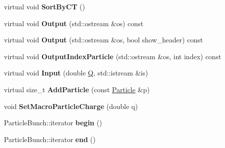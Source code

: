 \begin{DoxyCompactItemize}
virtual void {\bfseries Sort\+By\+CT} ()
\item 
\mbox{\label{classParticleTracking_1_1ParticleBunch_ab2c718545d78bc05e29d6f732859bb8c}} 
virtual void {\bfseries Output} (std\+::ostream \&os) const
\item 
\mbox{\label{classParticleTracking_1_1ParticleBunch_a072f88429da926afd6c60b6ec00fe767}} 
virtual void {\bfseries Output} (std\+::ostream \&os, bool show\+\_\+header) const
\item 
\mbox{\label{classParticleTracking_1_1ParticleBunch_aba428b139a379cb0413ebe63f046f1f5}} 
virtual void {\bfseries Output\+Index\+Particle} (std\+::ostream \&os, int index) const
\item 
\mbox{\label{classParticleTracking_1_1ParticleBunch_ab6d406ac47400a839e8f689c96133ddc}} 
virtual void {\bfseries Input} (double \hyperlink{namespaceParticleTracking_a3e89510a540596b235a808915deb0f7a}{Q}, std\+::istream \&is)
\item 
\mbox{\label{classParticleTracking_1_1ParticleBunch_a9702a34dc6146c73507e8050dec09e4f}} 
virtual size\+\_\+t {\bfseries Add\+Particle} (const \hyperlink{classPSvector}{Particle} \&p)
\item 
\mbox{\label{classParticleTracking_1_1ParticleBunch_a3d0b76d7d4de8a034551cb0b396881f0}} 
void {\bfseries Set\+Macro\+Particle\+Charge} (double q)
\item 
\mbox{\label{classParticleTracking_1_1ParticleBunch_a0a60374c23c8b8c9d99e7d1c6cb90847}} 
Particle\+Bunch\+::iterator {\bfseries begin} ()
\item 
\mbox{\label{classParticleTracking_1_1ParticleBunch_a02fa2b3c2101801795673309a13134fc}} 
Particle\+Bunch\+::iterator {\bfseries end} ()
\item 
\mbox{\label{classParticleTracking_1_1ParticleBunch_aee249404f054804edf5b2a6456d5a041}} 

\end{DoxyCompactItemize}
